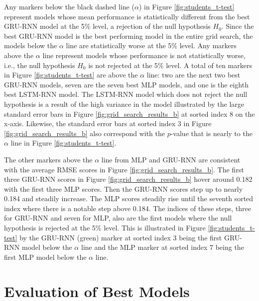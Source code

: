 Any markers below the black dashed line ($\alpha$) in Figure \ref{fig:students_t-test} represent models whose mean performance is statistically different from the best \ac{GRU-RNN} model at the 5\% level, a rejection of the null hypothesis $H_{0}$. Since the best \ac{GRU-RNN} model is the best performing model in the entire grid search, the models below the $\alpha$ line are statistically worse at the 5\% level. Any markers above the $\alpha$ line represent models whose performance is not statistically worse, i.e., the null hypothesis $H_{0}$ is not rejected at the 5\% level. A total of ten markers in Figure \ref{fig:students_t-test} are above the $\alpha$ line: two are the next two best \ac{GRU-RNN} models, seven are the seven best \ac{MLP} models, and one is the eighth best \ac{LSTM-RNN} model. The \ac{LSTM-RNN} model which does not reject the null hypothesis is a result of the high variance in the model illustrated by the large standard error bars in Figure \ref{fig:grid_search_results_b} at sorted index 8 on the x-axis. Likewise, the standard error bars at sorted index 3 in Figure \ref{fig:grid_search_results_b} also correspond with the $p$-value that is nearly to the $\alpha$ line in Figure \ref{fig:students_t-test}.

The other markers above the $\alpha$ line from \ac{MLP} and \ac{GRU-RNN} are consistent with the average RMSE scores in Figure \ref{fig:grid_search_results_b}. The first three \ac{GRU-RNN} scores in Figure \ref{fig:grid_search_results_b} hover around 0.182 with the first three \ac{MLP} scores. Then the \ac{GRU-RNN} scores step up to nearly 0.184 and steadily increase. The \ac{MLP} scores steadily rise until the seventh sorted index where there is a notable step above 0.184. The indices of these steps, three for \ac{GRU-RNN} and seven for \ac{MLP}, also are the first models where the null hypothesis is rejected at the 5\% level. This is illustrated in Figure \ref{fig:students_t-test} by the \ac{GRU-RNN} (green) marker at sorted index 3 being the first \ac{GRU-RNN} model below the $\alpha$ line and the \ac{MLP} marker at sorted index 7 being the first \ac{MLP} model below the $\alpha$ line.

\section{Evaluation of Best Models}
